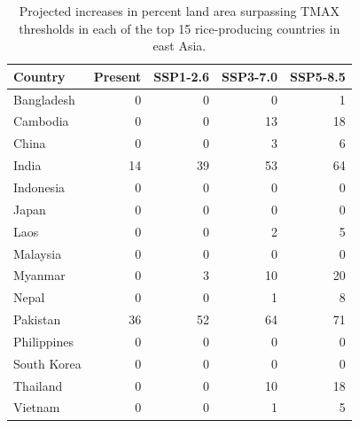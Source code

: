 \documentclass[
  letterpaper,
  DIV=11,
  numbers=noendperiod]{scrartcl}
\begin{document}
\begin{longtable}[]{@{}lrrrr@{}}

\caption{\label{tbl-country-summaries-table3}Projected increases in
percent land area surpassing TMAX thresholds in each of the top 15
rice-producing countries in east Asia.}

\tabularnewline

\toprule\noalign{}
Country & Present & SSP1-2.6 & SSP3-7.0 & SSP5-8.5 \\
\midrule\noalign{}
\endhead
\bottomrule\noalign{}
\endlastfoot
Bangladesh & 0 & 0 & 0 & 1 \\
Cambodia & 0 & 0 & 13 & 18 \\
China & 0 & 0 & 3 & 6 \\
India & 14 & 39 & 53 & 64 \\
Indonesia & 0 & 0 & 0 & 0 \\
Japan & 0 & 0 & 0 & 0 \\
Laos & 0 & 0 & 2 & 5 \\
Malaysia & 0 & 0 & 0 & 0 \\
Myanmar & 0 & 3 & 10 & 20 \\
Nepal & 0 & 0 & 1 & 8 \\
Pakistan & 36 & 52 & 64 & 71 \\
Philippines & 0 & 0 & 0 & 0 \\
South Korea & 0 & 0 & 0 & 0 \\
Thailand & 0 & 0 & 10 & 18 \\
Vietnam & 0 & 0 & 1 & 5 \\

\end{longtable}
\end{document}

